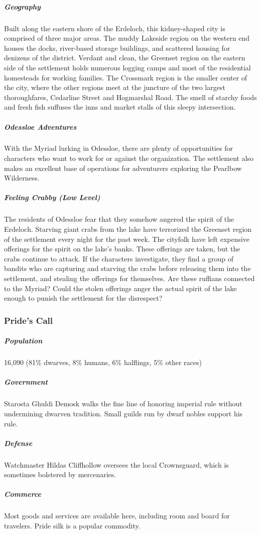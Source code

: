 \documentclass[10pt,a4paper,twoside,bg=print,twocolumn,openany,nodeprecatedcode]{dndbook}
\begin{document}
\subparagraph{Geography}
Built along the eastern shore of the Erdeloch, this kidney-shaped city is comprised of three major areas. The muddy Lakeside region on the western end houses the docks, river-based storage buildings, and scattered housing for denizens of the district. Verdant and clean, the Greenset region on the eastern side of the settlement holds numerous logging camps and most of the residential homesteads for working families. The Crossmark region is the smaller center of the city, where the other regions meet at the juncture of the two largest thoroughfares, Cedarline Street and Hogmarshal Road. The smell of starchy foods and fresh fish suffuses the inns and market stalls of this sleepy intersection.

\subparagraph{Odessloe Adventures}
With the Myriad lurking in Odessloe, there are plenty of opportunities for characters who want to work for or against the organization. The settlement also makes an excellent base of operations for adventurers exploring the Pearlbow Wilderness.

\subparagraph{Feeling Crabby (Low Level)}
The residents of Odessloe fear that they somehow angered the spirit of the Erdeloch. Starving giant crabs from the lake have terrorized the Greenset region of the settlement every night for the past week. The cityfolk have left expensive offerings for the spirit on the lake's banks. These offerings are taken, but the crabs continue to attack. If the characters investigate, they find a group of bandits who are capturing and starving the crabs before releasing them into the settlement, and stealing the offerings for themselves. Are these ruffians connected to the Myriad? Could the stolen offerings anger the actual spirit of the lake enough to punish the settlement for the disrespect?

\subsubsection{Pride's Call}
\subparagraph{Population}
16,090 (81\% dwarves, 8\% humans, 6\% halflings, 5\% other races)

\subparagraph{Government}
Starosta Ghuldi Demosk walks the fine line of honoring imperial rule without undermining dwarven tradition. Small guilds run by dwarf nobles support his rule.

\subparagraph{Defense}
Watchmaster Hildas Cliffhollow oversees the local Crownsguard, which is sometimes bolstered by mercenaries.

\subparagraph{Commerce}
Most goods and services are available here, including room and board for travelers. Pride silk is a popular commodity.
\end{document}
